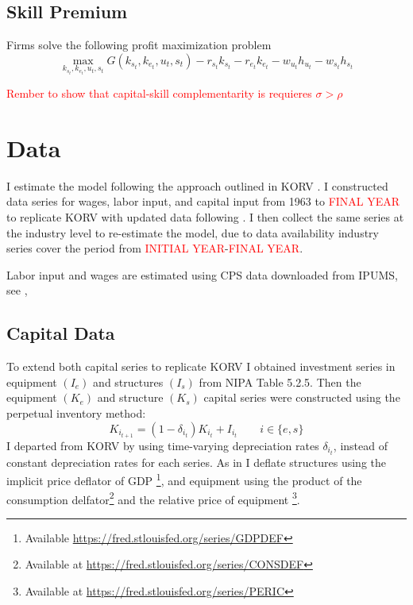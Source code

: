 \documentclass[12pt]{article}
\begin{document}
\subsection{Skill Premium}
Firms solve the following profit maximization problem 
\begin{equation}\label{eq:profit_max}
  \max_{k_{s_t}, k_{e_t}, u_t, s_t} G(k_{s_t}, k_{e_t}, u_t, s_t) - r_{s_t}k_{s_t} - r_{e_t}k_{e_t} - w_{u_t} h_{u_t} - w_{s_t} h_{s_t}
\end{equation}



\textcolor{red}{Rember to show that capital-skill complementarity is requieres $\sigma > \rho$}


\section{Data}\label{sec:data}
I estimate the model following the approach outlined in KORV \citet{krusell2000capital}. I constructed data series for wages, labor input, and capital input from 1963 to \textcolor{red}{FINAL YEAR} to replicate KORV with updated data following \citet{ohanian2021revisiting}. I then collect the same series at the industry level to re-estimate the model, due to data availability industry series cover the period from \textcolor{red}{INITIAL YEAR}-\textcolor{red}{FINAL YEAR}.

Labor input and wages are estimated using CPS data downloaded from IPUMS, see \citet{flood2015integrated}, 

\subsection{Capital Data}\label{sec:capital_data}
To extend both capital series to replicate KORV I obtained investment series in equipment $(I_e)$ and structures $(I_s)$ from NIPA Table 5.2.5. Then the equipment $(K_e)$ and structure $(K_s)$ capital series were constructed using the perpetual inventory method:
\begin{equation}
  K_{i_{t+1}} = (1 - \delta_{i_t}) K_{i_{t}} + I_{i_{t}} \qquad i\in\{e, s\}
\end{equation}
\noindent
I departed from KORV by using time-varying depreciation rates $\delta_{i_t}$, instead of constant depreciation rates for each series. As in \citep{ohanian2021revisiting} I deflate structures using the implicit price deflator of GDP \footnote{Available \url{https://fred.stlouisfed.org/series/GDPDEF}}, and equipment using the product of the consumption delfator\footnote{Available at \url{https://fred.stlouisfed.org/series/CONSDEF}} and the relative price of equipment \footnote{Available at \url{https://fred.stlouisfed.org/series/PERIC}}. 
\end{document}
